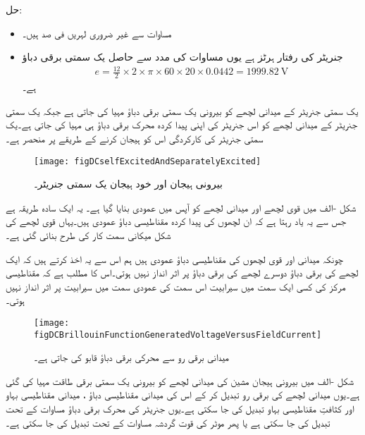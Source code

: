 حل:
\begin{itemize}
\item
مساوات   سے غیر ضروری لہریں  فی صد ہیں۔
\item
جنریٹر کی رفتار  ہرٹز ہے یوں مساوات   کی مدد سے حاصل یک سمتی برقی دباؤ
\begin{align*}
e=\frac{12}{2} \times 2 \times \pi \times 60 \times 20 \times 0.0442=\SI{1999.82}{\volt}
\end{align*}
ہے۔
\end{itemize}
%
 یک سمتی جنریٹر کے میدانی لچھے کو بیرونی یک سمتی برقی دباؤ مہیا کی جاتی ہے جبکہ  یک سمتی جنریٹر کے میدانی لچھے کو اس جنریٹر کی اپنی پیدا کردہ محرک برقی دباؤ ہی مہیا کی جاتی ہے۔یک سمتی جنریٹر کی کارکردگی اس کو ہیجان کرنے کے طریقے پر منحصر ہے۔
\begin{figure}
\centering
\texttt{[image: figDCselfExcitedAndSeparatelyExcited]}
\caption{بیرونی ہیجان اور خود ہیجان یک سمتی جنریٹر۔}
\label{شکل_یکسمتی_خود_ہیجان_بیرونی_ہیجان}
\end{figure}

شکل -الف میں قوی لچھے اور میدانی لچھے کو آپس میں عمودی بنایا گیا ہے۔ یہ ایک سادہ طریقہ ہے جس سے یہ یاد رہتا ہے کہ ان لچھوں کی پیدا کردہ مقناطیسی دباؤ عمودی ہیں۔یہاں قوی لچھے کی شکل میکانی سمت کار کی طرح بنائی گئی ہے۔

چونکہ میدانی اور قوی لچھوں کی مقناطیسی دباؤ عمودی ہیں ہم اس سے یہ اخذ کرتے ہیں کہ ایک لچھے کی برقی دباؤ دوسرے لچھے کی برقی دباؤ پر اثر انداز نہیں ہوتی۔اس کا مطلب ہے کہ مقناطیسی مرکز کی کسی ایک سمت میں  سیرابیت اس سمت کی عمودی سمت میں سیرابیت پر اثر انداز نہیں ہوتی۔

\begin{figure}
\centering
\texttt{[image: figDCBrillouinFunctionGeneratedVoltageVersusFieldCurrent]}
\caption{میدانی برقی رو سے محرکی برقی دباؤ قابو کی جاتی ہے۔}
\label{شکل_یکسمتی_پیدا_برقی_دباؤ_بالمقابل_میدانی_رو}
\end{figure}
شکل -الف میں بیرونی ہیجان مشین کی میدانی لچھے کو بیرونی یک سمتی برقی طاقت مہیا کی گئی ہے۔یوں میدانی لچھے کی برقی رو تبدیل کر کے اس کی میدانی مقناطیسی دباؤ  ، میدانی مقناطیسی بہاو   اور کثافتِ مقناطیسی بہاو   تبدیل کی جا سکتی ہے۔یوں جنریٹر کی محرک برقی دباؤ مساوات   کے تحت تبدیل کی جا سکتی ہے یا پھر موٹر کی قوت گردشہ مساوات   کے تحت تبدیل کی جا سکتی ہے۔

